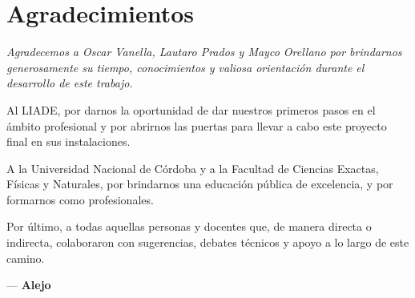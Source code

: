 \cleardoublepage
\chapter*{Agradecimientos}

\vspace*{0.15\textheight}

\begin{flushright}
\begin{minipage}{0.75\textwidth}
    \itshape
    Agradecemos a Oscar Vanella, Lautaro Prados y Mayco Orellano por brindarnos generosamente su tiempo, conocimientos y valiosa orientación durante el desarrollo de este trabajo.
    
    \vspace{0.3cm}
    Al LIADE, por darnos la oportunidad de dar nuestros primeros pasos en el ámbito profesional y por abrirnos las puertas para llevar a cabo este proyecto final en sus instalaciones.
    
    \vspace{0.3cm}
    A la Universidad Nacional de Córdoba y a la Facultad de Ciencias Exactas, Físicas y Naturales, por brindarnos una educación pública de excelencia, y por formarnos como profesionales.
    
    \vspace{0.3cm}
    Por último, a todas aquellas personas y docentes que, de manera directa o indirecta, colaboraron con sugerencias, debates técnicos y apoyo a lo largo de este camino.
    
    \vspace{0.6cm}
    \raggedleft — \textbf{Alejo}
\end{minipage}
\end{flushright}

\newpage %

\vspace*{0.02\textheight}

